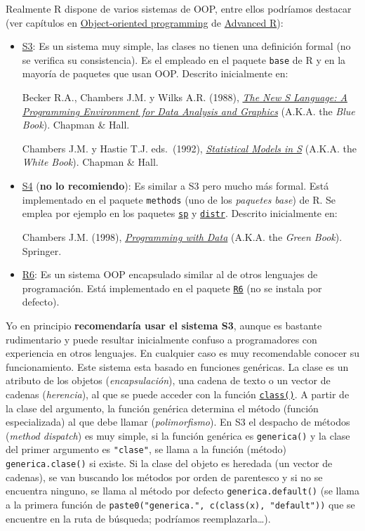 \documentclass[
]{book}
\theoremstyle{break}
\theoremstyle{nonumberplain}
\begin{document}
Realmente R dispone de varios sistemas de OOP, entre ellos podríamos destacar (ver capítulos en \href{https://adv-r.hadley.nz/oo.html}{Object-oriented programming} de \href{https://adv-r.hadley.nz}{Advanced R}):

\begin{itemize}
\item
  \href{https://adv-r.hadley.nz/s3.html}{S3}: Es un sistema muy simple, las clases no tienen una definición formal (no se verifica su consistencia). Es el empleado en el paquete \texttt{base} de R y en la mayoría de paquetes que usan OOP.
  Descrito inicialmente en:

  Becker R.A., Chambers J.M. y Wilks A.R. (1988), \emph{\href{https://www.amazon.es/dp/053409192X}{The New S Language: A Programming Environment for Data Analysis and Graphics}} (A.K.A. the \emph{Blue Book}). Chapman \& Hall.

  Chambers J.M. y Hastie T.J. eds.~(1992), \emph{\href{https://www.amazon.com/gp/product/0534167659}{Statistical Models in S}} (A.K.A. the \emph{White Book}). Chapman \& Hall.
\item
  \href{https://adv-r.hadley.nz/s4.html}{S4} (\textbf{no lo recomiendo}): Es similar a S3 pero mucho más formal. Está implementado en el paquete \texttt{methods} (uno de los \emph{paquetes base}) de R. Se emplea por ejemplo en los paquetes \href{https://github.com/edzer/sp/}{\texttt{sp}} y \href{http://distr.r-forge.r-project.org/}{\texttt{distr}}.
  Descrito inicialmente en:

  Chambers J.M. (1998), \emph{\href{https://www.amazon.com/gp/product/0387985034}{Programming with Data}} (A.K.A. the \emph{Green Book}). Springer.
\item
  \href{https://adv-r.hadley.nz/r6.html}{R6}: Es un sistema OOP encapsulado similar al de otros lenguajes de programación. Está implementado en el paquete \href{https://r6.r-lib.org}{\texttt{R6}} (no se instala por defecto).
\end{itemize}

Yo en principio \textbf{recomendaría usar el sistema S3}, aunque es bastante rudimentario y puede resultar inicialmente confuso a programadores con experiencia en otros lenguajes.
En cualquier caso es muy recomendable conocer su funcionamiento.
Este sistema esta basado en funciones genéricas.
La clase es un atributo de los objetos (\emph{encapsulación}), una cadena de texto o un vector de cadenas (\emph{herencia}), al que se puede acceder con la función \href{https://rdrr.io/r/base/class.html}{\texttt{class()}}.
A partir de la clase del argumento, la función genérica determina el método (función especializada) al que debe llamar (\emph{polimorfismo}).
En S3 el despacho de métodos (\emph{method dispatch}) es muy simple, si la función genérica es \texttt{generica()} y la clase del primer argumento es \texttt{"clase"}, se llama a la función (método) \texttt{generica.clase()} si existe.
Si la clase del objeto es heredada (un vector de cadenas), se van buscando los métodos por orden de parentesco y si no se encuentra ninguno, se llama al método por defecto \texttt{generica.default()} (se llama a la primera función de \texttt{paste0("generica.",\ c(class(x),\ "default"))} que se encuentre en la ruta de búsqueda; podríamos reemplazarla\ldots).
\end{document}
